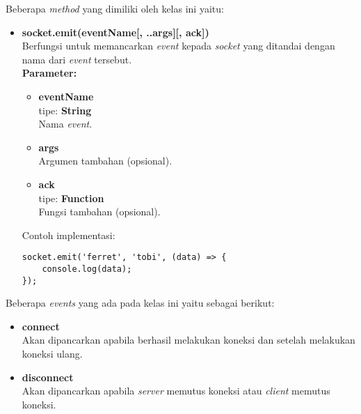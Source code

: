 \begin{enumerate}
	Beberapa \textit{method} yang dimiliki oleh kelas ini yaitu:
	
	\begin{itemize}
		
%	
	
	\item \textbf{socket.emit(eventName[, ..args][, ack])} \\ 
	Berfungsi untuk memancarkan \textit{event} kepada \textit{socket} yang ditandai dengan nama dari \textit{event} tersebut.\\ 
	\textbf{Parameter:}
	\begin{itemize}
		\item \textbf{eventName} \\tipe: \textbf{String} \\ Nama \textit{event}.
		\item \textbf{args} \\ Argumen tambahan (opsional).
		\item \textbf{ack} \\tipe: \textbf{Function} \\ Fungsi tambahan (opsional).
	\end{itemize}
	Contoh implementasi:
\begin{lstlisting}
socket.emit('ferret', 'tobi', (data) => {
	console.log(data);
});
\end{lstlisting}
	
	\end{itemize}

	Beberapa \textit{events} yang ada pada kelas ini yaitu sebagai berikut:
	\begin{itemize}
		\item \textbf{connect} \\ Akan dipancarkan apabila berhasil melakukan koneksi dan setelah melakukan koneksi ulang.
		\item \textbf{disconnect} \\ Akan dipancarkan apabila \textit{server} memutus koneksi atau \textit{client} memutus koneksi.
	\end{itemize}
\end{enumerate} 

